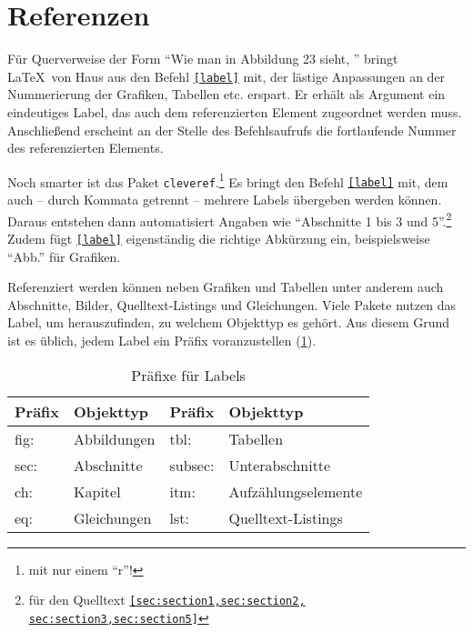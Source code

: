 \section{Referenzen}
\label{sec:references}

Für Querverweise der Form \enquote{Wie man in Abbildung 23 sieht, \textellipsis} bringt \LaTeX\ von Haus aus den Befehl \texttt{\ref{label}} mit, der lästige Anpassungen an der Nummerierung der Grafiken, Tabellen etc. erspart.
Er erhält als Argument ein eindeutiges Label, das auch dem referenzierten Element zugeordnet werden muss.
Anschließend erscheint an der Stelle des Befehlsaufrufs die fortlaufende Nummer des referenzierten Elements.


Noch smarter ist das Paket \texttt{cleveref}.\footnote{mit nur einem \enquote{r}!}
Es bringt den Befehl \texttt{\cref{label}} mit, dem auch -- durch Kommata getrennt -- mehrere Labels übergeben werden können.
Daraus entstehen dann automatisiert Angaben wie \enquote{Abschnitte 1 bis 3 und 5}.\footnote{für den Quelltext \texttt{\cref{sec:section1,sec:section2,
sec:section3,sec:section5}}}
Zudem fügt \texttt{\cref{label}} eigenständig die richtige Abkürzung ein, beispielsweise \enquote{Abb.} für Grafiken.

Referenziert werden können neben Grafiken und Tabellen unter anderem auch Abschnitte, Bilder, Quelltext-Listings und Gleichungen.
Viele Pakete nutzen das Label, um herauszufinden, zu welchem Objekttyp es gehört.
Aus diesem Grund ist es üblich, jedem Label ein Präfix voranzustellen (\cref{lst:reference-prefixes}).

\begin{table}[H]
  \centering
  \begin{tabular}{@{}llll@{}}
    \toprule
    Präfix & Objekttyp & Präfix & Objekttyp \\ \midrule
    fig: & Abbildungen & tbl:    & Tabellen            \\ 
    sec: & Abschnitte  & subsec: & Unterabschnitte     \\
    ch:  & Kapitel     & itm:    & Aufzählungselemente \\
    eq:  & Gleichungen & lst:    & Quelltext-Listings  \\ \bottomrule
  \end{tabular}
  \caption{Präfixe für Labels}
  \label{lst:reference-prefixes}
\end{table}

